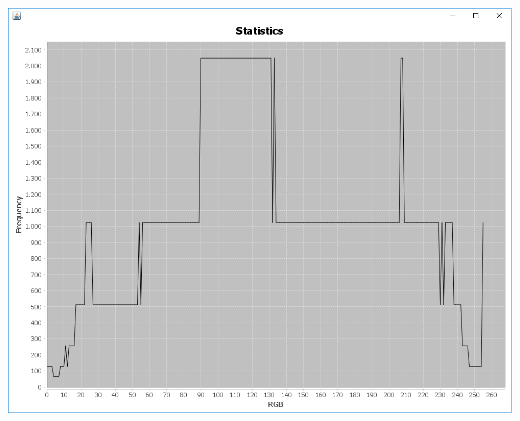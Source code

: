 \documentclass[a4paper,12pt]{article}
\begin{document}
\begin{center}
\includegraphics[width=0.8\linewidth,height=0.7\textheight]{Normalization/lena_normalizedPowerOfTwo}
\end{center}
\newpage
\end{document}
